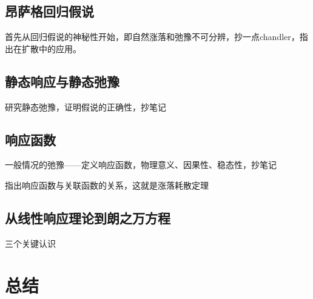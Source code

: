 \subsection{昂萨格回归假说}

首先从回归假说的神秘性开始，即自然涨落和弛豫不可分辨，抄一点chandler，指出在扩散中的应用。

\subsection{静态响应与静态弛豫}

研究静态弛豫，证明假说的正确性，抄笔记

\subsection{响应函数}

一般情况的弛豫——定义响应函数，物理意义、因果性、稳态性，抄笔记

指出响应函数与关联函数的关系，这就是涨落耗散定理

\subsection{从线性响应理论到朗之万方程}

三个关键认识

\section{总结}\label{sec:非平衡总结}
